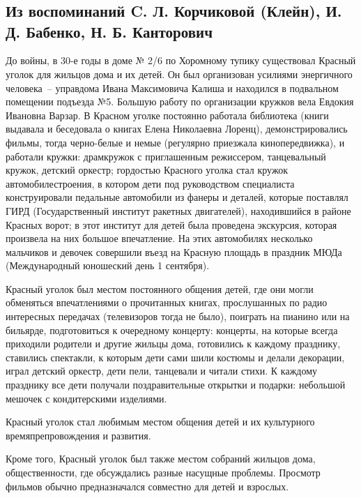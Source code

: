 \chapter{}

\section*{Из воспоминаний C. Л. Корчиковой (Клейн), И. Д. Бабенко, Н. Б. Канторович}

До войны, в 30-е годы в доме № 2/6 по Хоромному тупику существовал Красный уголок для жильцов дома и их детей. Он был организован усилиями энергичного человека~-- управдома Ивана Максимовича Калиша и находился в подвальном помещении подъезда №5. Большую работу по организации кружков вела Евдокия Ивановна Варзар. В Красном уголке постоянно работала библиотека (книги выдавала и беседовала о книгах Елена Николаевна Лоренц), демонстрировались фильмы, тогда черно-белые и немые (регулярно приезжала кинопередвижка), и работали кружки: драмкружок с приглашенным режиссером,   танцевальный   кружок, детский   оркестр; гордостью    Красного уголка стал    кружок автомобилестроения,   в   котором дети под руководством специалиста конструировали     педальные   автомобили   из   фанеры и деталей, которые поставлял ГИРД (Государственный   институт ракетных двигателей), находившийся в   районе   Красных   ворот;   в этот институт для детей   была проведена  экскурсия,    которая  произвела на  них    большое   впечатление. На этих автомобилях несколько мальчиков и   девочек совершили   въезд  на Красную площадь    в   праздник МЮДа   (Международный   юношеский день 1 сентября).

Красный уголок был местом постоянного общения  детей, где они могли обменяться впечатлениями о прочитанных книгах,    прослушанных   по   радио интересных передачах (телевизоров тогда не было), поиграть на пианино или на бильярде, подготовиться      к очередному концерту: концерты,   на   которые всегда приходили   родители и   другие жильцы дома, готовились    к каждому празднику, ставились спектакли, к которым дети сами шили костюмы и делали декорации,   играл   детский оркестр,   дети     пели, танцевали и читали стихи. К каждому празднику все   дети получали поздравительные открытки и подарки:   небольшой   мешочек   с кондитерскими изделиями.

Красный уголок стал любимым местом общения детей и их культурного времяпрепровождения и развития.


Кроме того, Красный уголок был также местом собраний жильцов дома, общественности, где обсуждались разные насущные проблемы. Просмотр фильмов обычно предназначался совместно для детей и взрослых.

